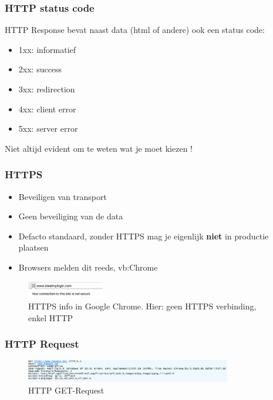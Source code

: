 \documentclass{article}
\newcommand{\bold}[1]{\textbf{#1}}
\begin{document}
\subsubsection{HTTP status code}
HTTP Response bevat naast data (html of andere) ook een status code: 

\begin{itemize}
    \item 1xx: informatief
    \item 2xx: success
    \item 3xx: redirection
    \item 4xx: client error
    \item 5xx: server error
\end{itemize}

Niet altijd evident om te weten wat je moet kiezen !

\subsubsection{HTTPS}

\begin{itemize}
    \item Beveiligen van transport
    \item Geen beveiliging van de data
    \item Defacto standaard, zonder HTTPS mag je eigenlijk \bold{niet} in productie plaatsen
    \item Browsers melden dit reeds, vb:Chrome
\end{itemize}

\begin{figure}[H]
    \centering
    \includegraphics[width=0.3\textwidth]{https.png}
    \caption{HTTPS info in Google Chrome. Hier: geen HTTPS verbinding, enkel HTTP}
\end{figure}

\subsubsection{HTTP Request}
\begin{figure}[H]
    \centering
    \includegraphics[width=0.8\textwidth]{http-request.png}
    \caption{HTTP GET-Request}
\end{figure}
\end{document}
